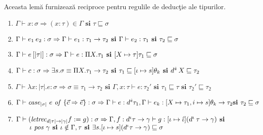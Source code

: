 \begin{lemma}\label{inversion}
Aceasta lem\u a furnizeaz\u a reciproce pentru regulile de deduc\c tie ale tipurilor.
\begin{enumerate}
\item $\Gamma \vdash x : \sigma \Rightarrow (x : \tau) \in \Gamma \textbf{ si } \tau \sqsubseteq \sigma$
\item $\Gamma \vdash e_1\hspace{2pt} e_2 : \sigma \Rightarrow \Gamma \vdash e_1 : \tau_1 \to \tau_2 \textbf{ si }
                                                \Gamma \vdash e_2 : \tau_1 \textbf{ si }
                                                \tau_2 \sqsubseteq \sigma $
\item $\Gamma \vdash e \hspace{2pt}[|\tau|] : \sigma  \Rightarrow \Gamma \vdash e : \Pi X . \tau_1 \textbf{ si }
                                                [X \mapsto \tau ] \tau_1 \sqsubseteq \sigma $
\item $\Gamma \vdash c : \sigma  \Rightarrow \exists s. \sigma \equiv \Pi X.\tau_1 \to \tau_2 \textbf{ si }
                                        \tau_1 \sqsubseteq [\iota \mapsto s]\theta_k \textbf{ si }
                                        d^{\hat{s}}\hspace{2pt} X \sqsubseteq \tau_2$
\item $\Gamma \vdash \lambda x : {|\tau|}. e :\sigma \Rightarrow \sigma \equiv \tau_1 \to \tau_2  \textbf{ si }
                                                        \Gamma , x:\tau \vdash e : \tau_2' \textbf{ si }
                                                        \tau_1 \sqsubseteq \tau \textbf{ si }
                                                        \tau_2' \sqsubseteq \tau_2$
\item $\Gamma \vdash \text{\emph{case}}_{|\sigma|}\ e \text{ \emph{of} } \{ \vec{c} \Rightarrow \vec{e} \} : \sigma \Rightarrow
                        \Gamma \vdash e : d^{\hat{s}}\tau_1,
                        \Gamma \vdash e_k : [X \mapsto \tau_1, i \mapsto s] \theta_k \to \tau_2 \textbf{si }
                        \tau_2 \sqsubseteq \sigma$
\item $ \Gamma  \vdash (\text{\emph{letrec}}_{d |\tau| \to |\gamma|} f:=g) : \sigma \Rightarrow
        \Gamma,f : d^{{\iota}} \tau \to \gamma \vdash g : [\iota \mapsto \hat{\iota}] (d^{{\iota}}\hspace{2pt} \tau \to \gamma) \textbf{ si }$
        $\qquad \iota \text{ \emph{pos} } \gamma \textbf{ si } \iota \notin \Gamma , \tau \textbf{ si } \exists s.[\iota \mapsto s] (d^{{\iota}} \tau \to \gamma) \sqsubseteq \sigma $
\end{enumerate}
\end{lemma}

